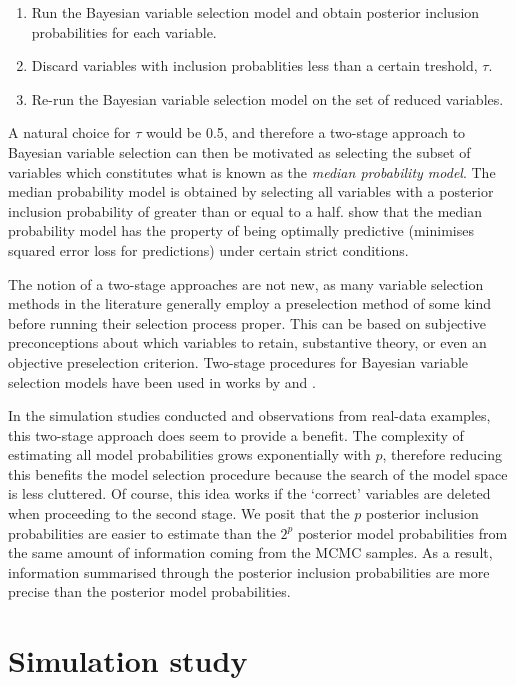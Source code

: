 \documentclass[showframe,11pt,twoside,openright]{report}
\begin{document}
\begin{enumerate}
  \item Run the Bayesian variable selection model and obtain posterior inclusion probabilities for each variable.
  \item Discard variables with inclusion probablities less than a certain treshold, $\tau$.
  \item Re-run the Bayesian variable selection model on the set of reduced variables.
\end{enumerate}

A natural choice for $\tau$ would be 0.5, and therefore a two-stage approach to Bayesian variable selection can then be motivated as selecting the subset of variables which constitutes what is known as the \emph{median probability model}.
The median probability model is obtained by selecting all variables with a posterior inclusion probability of greater than or equal to a half.
\citet{Barbieri2004} show that the median probability model has the property of being optimally predictive (minimises squared error loss for predictions) under certain strict conditions. 

The notion of a two-stage approaches are not new, as many variable selection methods in the literature generally employ a preselection method of some kind before running their selection process proper.
This can be based on subjective preconceptions about which variables to retain, substantive theory, or even an objective preselection criterion.
Two-stage procedures for Bayesian variable selection models have been used in works by \citet{Fouskakis2008} and \citet{Ntzoufras2008}. 

In the simulation studies conducted and observations from real-data examples, this two-stage approach does seem to provide a benefit.
The complexity of estimating all model probabilities grows exponentially with $p$, therefore reducing this benefits the model selection procedure because the search of the model space is less cluttered.
Of course, this idea works if the `correct' variables are deleted when proceeding to the second stage.
We posit that the $p$ posterior inclusion probabilities are easier to estimate than the $2^p$ posterior model probabilities from the same amount of information coming from the MCMC samples.
As a result, information summarised through the posterior inclusion probabilities are more precise than the posterior model probabilities.

\section{Simulation study}
\end{document}
